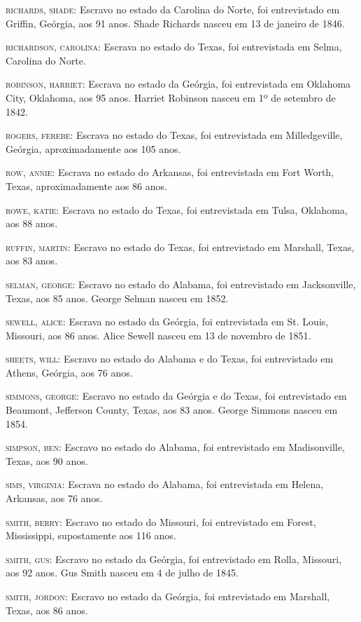 \begin{Parskip}
\textsc{richards, shade:} Escravo no estado da Carolina do Norte, foi
entrevistado em Griffin, Geórgia, aos 91 anos. Shade Richards nasceu em
13 de janeiro de 1846.

\textsc{richardson, carolina:} Escrava no estado do Texas, foi
entrevistada em Selma, Carolina do Norte.

\textsc{robinson, harriet:} Escrava no estado da Geórgia, foi
entrevistada em Oklahoma City, Oklahoma, aos 95 anos. Harriet Robinson
nasceu em 1º de setembro de 1842.

\textsc{rogers, ferebe:} Escrava no estado do Texas, foi entrevistada em
Milledgeville, Geórgia, aproximadamente aos 105 anos.

\textsc{row, annie:} Escrava no estado do Arkansas, foi entrevistada em
Fort Worth, Texas, aproximadamente aos 86 anos.

\textsc{rowe, katie:} Escrava no estado do Texas, foi entrevistada em
Tulsa, Oklahoma, aos 88 anos.

\textsc{ruffin, martin:} Escravo no estado do Texas, foi entrevistado em
Marshall, Texas, aos 83 anos.

\textsc{selman, george:} Escravo no estado do Alabama, foi entrevistado
em Jacksonville, Texas, aos 85 anos. George Selman nasceu em 1852.

\textsc{sewell, alice:} Escrava no estado da Geórgia, foi entrevistada
em St. Louis, Missouri, aos 86 anos. Alice Sewell nasceu em 13 de
novembro de 1851.

\textsc{sheets, will:} Escravo no estado do Alabama e do Texas, foi
entrevistado em Athens, Geórgia, aos 76 anos.

\textsc{simmons, george:} Escravo no estado da Geórgia e do Texas, foi
entrevistado em Beaumont, Jefferson County, Texas, aos 83 anos. George
Simmons nasceu em 1854.

\textsc{simpson, ben:} Escravo no estado do Alabama, foi entrevistado em
Madisonville, Texas, aos 90 anos.

\textsc{sims, virginia:} Escrava no estado do Alabama, foi entrevistada
em Helena, Arkansas, aos 76 anos.

\textsc{smith, berry:} Escravo no estado do Missouri, foi entrevistado
em Forest, Mississippi, supostamente aos 116 anos.

\textsc{smith, gus:} Escravo no estado da Geórgia, foi entrevistado em
Rolla, Missouri, aos 92 anos. Gus Smith nasceu em 4 de julho de 1845.

\textsc{smith, jordon:} Escravo no estado da Geórgia, foi entrevistado
em Marshall, Texas, aos 86 anos.


\end{Parskip}
